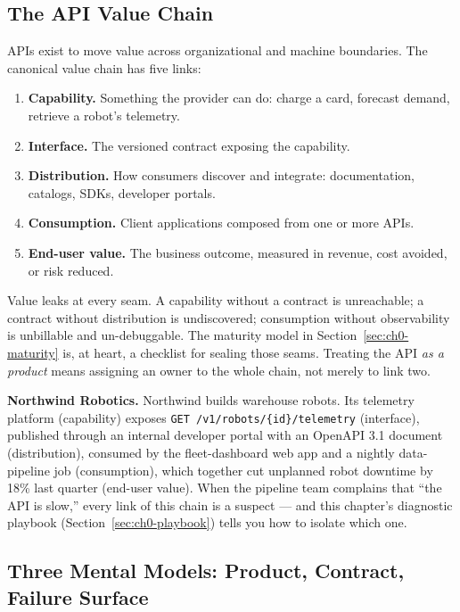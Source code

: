 \subsection{The API Value Chain}

APIs exist to move value across organizational and machine boundaries. The
canonical value chain has five links:

\begin{enumerate}
  \item \textbf{Capability.} Something the provider can do: charge a card,
        forecast demand, retrieve a robot's telemetry.
  \item \textbf{Interface.} The versioned contract exposing the capability.
  \item \textbf{Distribution.} How consumers discover and integrate:
        documentation, catalogs, SDKs, developer portals.
  \item \textbf{Consumption.} Client applications composed from one or more
        APIs.
  \item \textbf{End-user value.} The business outcome, measured in revenue,
        cost avoided, or risk reduced.
\end{enumerate}

Value leaks at every seam. A capability without a contract is unreachable; a
contract without distribution is undiscovered; consumption without
observability is unbillable and un-debuggable. The maturity model in
Section~\ref{sec:ch0-maturity} is, at heart, a checklist for sealing those
seams. Treating the API \emph{as a product} \cite{gehl2021apidesign} means
assigning an owner to the whole chain, not merely to link two.

\begin{examplebox}
\textbf{Northwind Robotics.} Northwind builds warehouse robots. Its telemetry
platform (capability) exposes \texttt{GET /v1/robots/\{id\}/telemetry}
(interface), published through an internal developer portal with an OpenAPI
3.1 document \cite{openapi31} (distribution), consumed by the fleet-dashboard
web app and a nightly data-pipeline job (consumption), which together cut
unplanned robot downtime by 18\% last quarter (end-user value). When the
pipeline team complains that ``the API is slow,'' every link of this chain is
a suspect --- and this chapter's diagnostic playbook
(Section~\ref{sec:ch0-playbook}) tells you how to isolate which one.
\end{examplebox}

\subsection{Three Mental Models: Product, Contract, Failure Surface}

